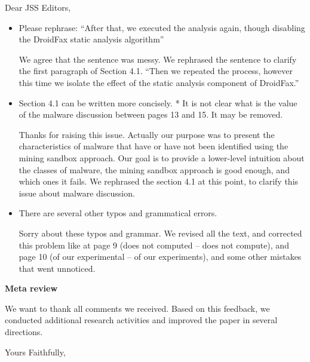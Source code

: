 \documentclass[12pt,english]{scrartcl}
\begin{document}
\begin{letter}{Dear JSS Editors,}
\begin{itemize}
\vspace{0.2cm}

\item Please rephrase: ``After that, we executed the analysis again, though disabling the DroidFax static analysis algorithm''

\vspace{0.2cm}

{\color{blue}{\bf Answer.} We agree that the sentence was messy. We rephrased the sentence to clarify the first paragraph of Section 4.1. ``Then we repeated the process, however this time we isolate the effect of the static analysis component of DroidFax.''}

\vspace{0.2cm}

\item Section 4.1 can be written more concisely.
* It is not clear what is the value of the malware discussion between pages 13 and 15. It may be removed.

\vspace{0.2cm}

{\color{blue}{\bf Answer.} Thanks for raising this issue. Actually our purpose was to present the characteristics of malware that have or have not been identified using the mining sandbox approach. Our goal is to provide a lower-level intuition about the classes of malware, the mining sandbox approach is good enough, and which ones it fails. We rephrased the section 4.1 at this point, to clarify this issue about malware discussion.}

\vspace{0.2cm}

\item There are several other typos and grammatical errors.


\vspace{0.2cm}

{\color{blue}{\bf Answer.} Sorry about these typos and grammar. We revised all the text, and corrected this problem like at page 9 (does not computed – does not compute), and page 10 (of our experimental – of our experiments), and some other mistakes that went unnoticed.}





\end{itemize}



{\bf Meta review}

We want to thank all comments we received. Based on this feedback, we conducted additional research activities and improved the paper in several directions.

\closing{Yours Faithfully,}





\end{letter}
\end{document}
